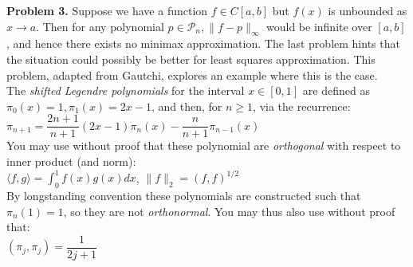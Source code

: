 \documentclass[14pt,a4paper]{article}
\begin{document}
\label{Problem 3}
\large\textbf{Problem 3.} Suppose we have a function $f \in C[a,b]$ but $f(x)$ is unbounded as $x \rightarrow a$. Then for any polynomial $p \in \mathcal{P}_n, \|f-p\|_{\infty}$ would be infinite over $[a,b]$, and hence there exists no minimax approximation. The last problem hints that the situation could possibly be better for least squares approximation. This problem, adapted from Gautchi, explores an example where this is the case.\\
The \textit{shifted Legendre polynomials} for the interval $x \in [0,1]$ are defined as $\pi_0(x)= 1, \pi_1(x) = 2x -1$, and then, for $n \geq 1$, via the recurrence:\\
\hspace*{4cm} $\pi_{n+1} = \dfrac{2n+1}{n+1} (2x-1)\pi_n(x) - \dfrac{n}{n+1}\pi_{n-1}(x)$\\
You may use without proof that these polynomial are \textit{orthogonal} with respect to inner product (and norm):\\
\hspace*{4cm} $\langle f,g\rangle = \int_{0}^{1} f(x)g(x)dx$, \hspace{1cm} $\|f\|_2 = (f,f)^{1/2}$\\
By longstanding convention these polynomials are constructed such that $\pi_n(1) =1$, so they are not \textit{orthonormal}. You may thus also use without proof that:\\
\hspace*{5cm} $ \left( \pi_j,\pi_j\right) = \dfrac{1}{2j+1}$\\
\end{document}
